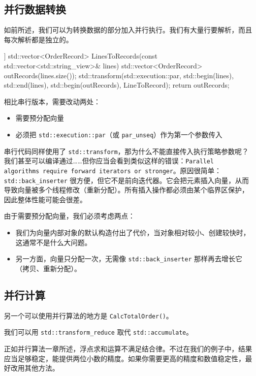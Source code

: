 \subsection{并行数据转换}

如前所述，我们可以为转换数据的部分加入并行执行。我们有大量行要解析，而且每次解析都是独立的。

\begin{codebox}[cpp]
[[nodiscard]] std::vector<OrderRecord>
LinesToRecords(const std::vector<std::string_view>& lines)
{
std::vector<OrderRecord> outRecords(lines.size());
std::transform(std::execution::par, std::begin(lines), std::end(lines),
std::begin(outRecords), LineToRecord);
return outRecords;
}
\end{codebox}

相比串行版本，需要改动两处：
\begin{itemize}
\item 需要预分配向量
\item 必须把 \texttt{std::execution::par}（或 \texttt{par\_unseq}）作为第一个参数传入
\end{itemize}

串行代码同样使用了 \texttt{std::transform}，那为什么不能直接传入执行策略参数呢？我们甚至可以编译通过……但你应当会看到类似这样的错误：\texttt{Parallel algorithms require forward iterators or stronger}。原因很简单：\texttt{std::back\_inserter} 很方便，但它不是前向迭代器。它会把元素插入向量，从而导致向量被多个线程修改（重新分配）。所有插入操作都必须由某个临界区保护，因此整体性能可能会很差。

由于需要预分配向量，我们必须考虑两点：
\begin{itemize}
\item 我们为向量内部对象的默认构造付出了代价，当对象相对较小、创建较快时，这通常不是什么大问题。
\item 另一方面，向量只分配一次，无需像 \texttt{std::back\_inserter} 那样再去增长它（拷贝、重新分配）。
\end{itemize}

\subsection{并行计算}

另一个可以使用并行算法的地方是 \texttt{CalcTotalOrder()}。

我们可以用 \texttt{std::transform\_reduce} 取代 \texttt{std::accumulate}。

正如并行算法一章所述，浮点求和运算不满足结合律。不过在我们的例子中，结果应当足够稳定，能提供两位小数的精度。如果你需要更高的精度和数值稳定性，最好改用其他方法。

